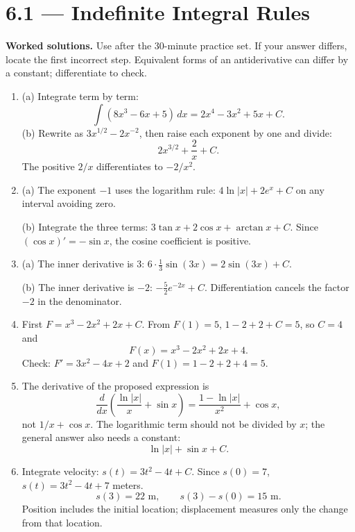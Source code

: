 \documentclass[11pt]{article}
\newcommand{\dx}{\,dx}
\begin{document}
\section*{6.1 --- Indefinite Integral Rules}
\textbf{Worked solutions.} Use after the 30-minute practice set. If your answer differs, locate the first incorrect step. Equivalent forms of an antiderivative can differ by a constant; differentiate to check.
\begin{enumerate}
\item (a) Integrate term by term:
\[
\int(8x^3-6x+5)\dx=\boxed{2x^4-3x^2+5x+C}.
\]
(b) Rewrite as $3x^{1/2}-2x^{-2}$, then raise each exponent by one and divide:
\[
\boxed{2x^{3/2}+\frac2x+C}.
\]
The positive $2/x$ differentiates to $-2/x^2$.
\item (a) The exponent $-1$ uses the logarithm rule:
$\boxed{4\ln|x|+2e^x+C}$ on any interval avoiding zero.

(b) Integrate the three terms:
$\boxed{3\tan x+2\cos x+\arctan x+C}$.
Since $(\cos x)'=-\sin x$, the cosine coefficient is positive.
\item (a) The inner derivative is $3$:
$6\cdot\frac13\sin(3x)=\boxed{2\sin(3x)+C}$.

(b) The inner derivative is $-2$:
$\boxed{-\frac52e^{-2x}+C}$.
Differentiation cancels the factor $-2$ in the denominator.
\item First $F=x^3-2x^2+2x+C$. From $F(1)=5$,
$1-2+2+C=5$, so $C=4$ and
\[
\boxed{F(x)=x^3-2x^2+2x+4}.
\]
Check: $F'=3x^2-4x+2$ and $F(1)=1-2+2+4=5$.
\item The derivative of the proposed expression is
\[
\frac{d}{dx}\left(\frac{\ln|x|}{x}+\sin x\right)
=\frac{1-\ln|x|}{x^2}+\cos x,
\]
not $1/x+\cos x$. The logarithmic term should not be divided by $x$; the general answer also needs a constant:
\[
\boxed{\ln|x|+\sin x+C}.
\]
\item Integrate velocity: $s(t)=3t^2-4t+C$.
Since $s(0)=7$, $\boxed{s(t)=3t^2-4t+7}$ meters.
\[
\boxed{s(3)=22\text{ m}},\qquad
\boxed{s(3)-s(0)=15\text{ m}}.
\]
Position includes the initial location; displacement measures only the change from that location.
\end{enumerate}
\end{document}
